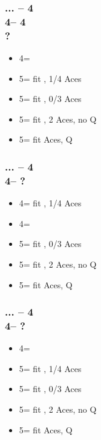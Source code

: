 \documentclass[12pt, a4paper]{report}
\begin{document}
{    \subsubsection*{... -- 4\clubs\\
                    4\diams -- 4\spades\\
                    ?}
    \begin{itemize}
        \item 4\nt = \soff
        \item 5\clubs = fit \diams, 1/4 Aces
        \item 5\diams = fit \diams, 0/3 Aces
        \item 5\hearts = fit \diams, 2 Aces, no Q\diams
        \item 5\spades = fit  Aces, Q\diams
    \end{itemize}

    \subsubsection*{... -- 4\clubs\\
                    4\hearts -- ?}
    \begin{itemize}
        \item 4\spades = fit \clubs, 1/4 Aces
        \item 4\nt = \soff
        \item 5\clubs = fit \clubs, 0/3 Aces
        \item 5\diams = fit \clubs, 2 Aces, no Q\clubs
        \item 5\hearts = fit  Aces, Q\clubs
    \end{itemize}

    \subsubsection*{... -- 4\clubs\\
                    4\spades -- ?}
    \begin{itemize}
        \item 4\nt = \soff
        \item 5\clubs = fit \diams, 1/4 Aces
        \item 5\diams = fit \diams, 0/3 Aces
        \item 5\hearts = fit \diams, 2 Aces, no Q\diams
        \item 5\spades = fit  Aces, Q\diams
    \end{itemize}

}
\end{document}

